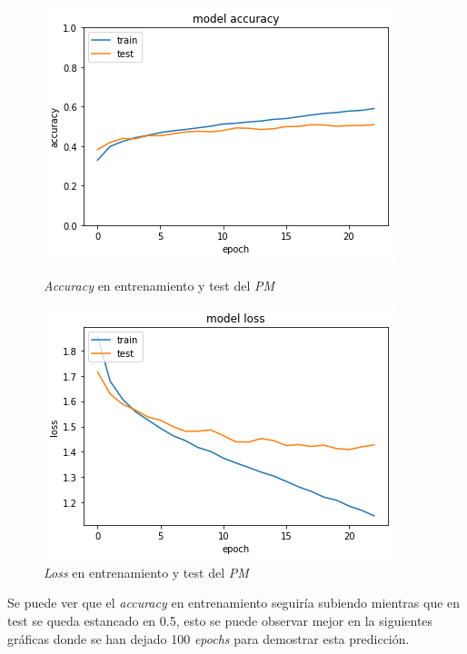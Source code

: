 \documentclass{uc3mpracticas}
\begin{document}
\begin{figure}[!h]
\centering
\begin{minipage}{.52\textwidth}
  \centering
  \includegraphics[width=.8\linewidth]{Images/accuracyPM.png}
  \caption*{\textit{Accuracy} en entrenamiento y test del \textit{PM}}
\end{minipage}%
\begin{minipage}{.52\textwidth}
  \centering
  \includegraphics[width=.8\linewidth]{Images/lossPM.png}
  \caption*{\textit{Loss} en entrenamiento y test del \textit{PM}}
\end{minipage}
\end{figure}

Se puede ver que el \textit{accuracy} en entrenamiento seguiría subiendo mientras que en test se queda estancado en 0.5, esto se puede observar mejor en la siguientes gráficas donde se han dejado 100 \textit{epochs} para demostrar esta predicción.
\end{document}

